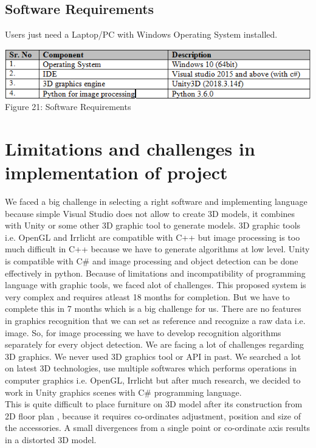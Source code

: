 \documentclass{article}
\begin{document}
\subsection{Software Requirements}
Users just need a Laptop/PC with Windows Operating System installed.
\begin{center}
\includegraphics[scale=0.8]{table1}
\\Figure 21: Software Requirements
\end{center}

\section{Limitations and challenges in implementation of project}

We faced a big challenge in selecting a right software and implementing language because simple Visual Studio does not allow to create 3D models, it combines with Unity or some other 3D graphic tool to generate models.
3D graphic tools i.e. OpenGL and Irrlicht are compatible with C++ but image processing is too much difficult in C++ because we have to generate algorithms at low level. Unity is compatible with C\# and image processing and object detection can be done effectively in python. Because of limitations and incompatibility of programming language with graphic tools, we faced alot of challenges.
This proposed system is very complex and requires atleast 18 months for completion. But we have to complete this in 7 months which is a big challenge for us.
There are no features in graphics recognition that we can set as reference and recognize a raw data i.e. image. So, for image processing we have to develop recognition algorithms separately for every object detection.
We  are facing a lot of challenges regarding 3D graphics. We never used 3D graphics tool or API in past. We searched a lot on latest 3D technologies, use multiple softwares which performs operations in computer graphics i.e. OpenGL, Irrlicht but after much research, we decided to work in Unity graphics scenes with C\# programming language.\cite{unity}\\
This is quite difficult to place furniture on 3D model after its construction from 2D floor plan , because it requires co-ordinates adjustment, position and size  of the accessories. A small divergences from a single point or co-ordinate axis results in a distorted 3D model.\cite{chall}
\end{document}
